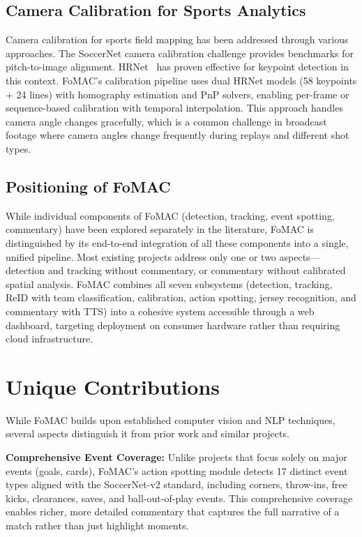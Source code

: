 \documentclass[10pt,twocolumn,a4paper]{article}
\begin{document}
\subsection{Camera Calibration for Sports Analytics}

Camera calibration for sports field mapping has been addressed through various approaches. The SoccerNet camera calibration challenge provides benchmarks for pitch-to-image alignment. HRNet~\cite{sun2019hrnet} has proven effective for keypoint detection in this context. FoMAC's calibration pipeline uses dual HRNet models (58 keypoints + 24 lines) with homography estimation and PnP solvers, enabling per-frame or sequence-based calibration with temporal interpolation. This approach handles camera angle changes gracefully, which is a common challenge in broadcast footage where camera angles change frequently during replays and different shot types.

\subsection{Positioning of FoMAC}

While individual components of FoMAC (detection, tracking, event spotting, commentary) have been explored separately in the literature, FoMAC is distinguished by its end-to-end integration of all these components into a single, unified pipeline. Most existing projects address only one or two aspects---detection and tracking without commentary, or commentary without calibrated spatial analysis. FoMAC combines all seven subsystems (detection, tracking, ReID with team classification, calibration, action spotting, jersey recognition, and commentary with TTS) into a cohesive system accessible through a web dashboard, targeting deployment on consumer hardware rather than requiring cloud infrastructure.

\section{Unique Contributions}

While FoMAC builds upon established computer vision and NLP techniques, several aspects distinguish it from prior work and similar projects.

\textbf{Comprehensive Event Coverage:} Unlike projects that focus solely on major events (goals, cards), FoMAC's action spotting module detects 17 distinct event types aligned with the SoccerNet-v2 standard, including corners, throw-ins, free kicks, clearances, saves, and ball-out-of-play events. This comprehensive coverage enables richer, more detailed commentary that captures the full narrative of a match rather than just highlight moments.
\end{document}
